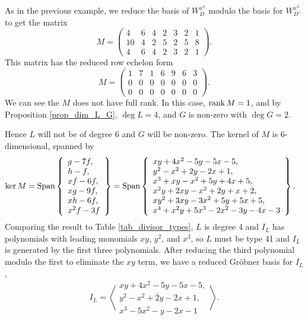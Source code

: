 As in the previous example, we reduce the basis of $W_{D}^{x^4}$ modulo the basis for $W_{D'}^{x^4}$ to get the matrix
\[ M = \begin{pmatrix}
   4 & 6 & 4 & 2 & 3 & 2 & 1 \\
  10 & 4 & 2 & 5 & 2 & 5 & 8 \\
   4 & 6 & 4 & 2 & 3 & 2 & 1
\end{pmatrix}. \]
This matrix has the reduced row echelon form
\[ M = \begin{pmatrix}
  1 & 7 & 1 & 6 & 9 & 6 & 3 \\
  0 & 0 & 0 & 0 & 0 & 0 & 0 \\
  0 & 0 & 0 & 0 & 0 & 0 & 0
\end{pmatrix}. \]
We can see the $M$ does not have full rank.
In this case, $\operatorname{rank} M = 1$, and by Proposition \ref{prop_dim_L_G},
$\deg L = 4$, and $G$ is non-zero with $\deg G = 2$.

Hence $L$ will not be of degree 6 and $G$ will be non-zero.
The kernel of $M$ is 6-dimensional, spanned by
\begin{align*}
  \ker M
    &= \operatorname{Span} \left\{ \begin{array}{l}
      g - 7f, \\
      h -  f, \\
      xf - 6f, \\
      xg - 9f, \\
      xh - 6f, \\
      x^2f - 3f \end{array} \right\} 
    = \operatorname{Span} \left\{ \begin{array}{l}
      xy + 4x^2 - 5y - 5x - 5, \\
      y^2 - x^2 + 2y - 2x + 1, \\
      x^3 + xy - x^2 + 5y + 4x + 5, \\
      x^2y + 2xy - x^2 + 2y + x + 2, \\
      xy^2 + 3xy - 3x^2 + 5y + 5x + 5, \\
      x^4 + x^2y + 5x^3 - 2x^2 - 3y - 4x - 3
    \end{array} \right\}.
\end{align*}
Comparing the result to Table \ref{tab_divisor_types},
$L$ is degree 4 and $I_L$ has polynomials with leading monomials $xy$, $y^2$, and $x^3$,
so $L$ must be type 41 and $I_L$ is generated by the first three polynomials.
After reducing the third polynomial modulo the first to eliminate the $xy$ term,
we have a reduced Gr\"obner basis for $I_L$,
\[ I_L = \left\langle\begin{array}{l}
      xy  + 4x^2 - 5y - 5x - 5, \\
      y^2 -  x^2 + 2y - 2x + 1, \\
      x^3 - 5x^2 -  y - 2x - 1
  \end{array}\right\rangle. \]

